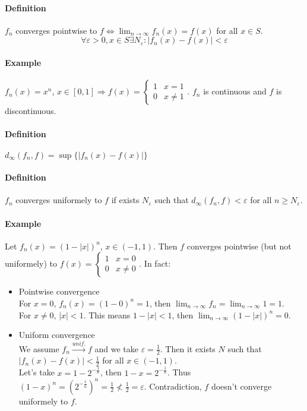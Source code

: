 \documentclass{article}
\newcommand{\DS}{\displaystyle}
\newcommand{\abs}[1]{\left|#1\right|}
\newcommand{\limn}{\lim_{n \to \infty}}
\newcommand{\tounif}{\xrightarrow{unif.}}
\newcommand{\intcc}[1]{\left[#1\right]}
\newcommand{\intoo}[1]{\left(#1\right)}
\newcommand{\Ep}{\varepsilon}
\newcommand{\Def}{\paragraph{Definition}}
\newcommand{\Example}{\paragraph{Example}}
\begin{document}
  \Def $f_n$ converges pointwise to $f \iff \DS \limn{f_n(x)} = f(x)$ for all
  $x \in S$.
\begin{equation*}
  \forall \Ep > 0, x \in S \exists N_\Ep : \abs{f_n(x) - f(x)} < \Ep
\end{equation*}

  \Example $f_n(x) = x^n$, $x \in \intcc{0,1} \Rightarrow f(x) =
  \begin{cases}1 & x = 1 \\ 0 & x \neq 1\end{cases}$. $f_n$ is continuous and
  $f$ is discontinuous.

  \Def $d_\infty(f_n,f) = \sup \{ \abs{f_n(x) - f(x)} \}$

  \Def $f_n$ converges uniformely to $f$ if exists $N_\Ep$ such that
  $d_\infty(f_n,f) < \Ep$ for all $n \geq N_\Ep$.

  \Example Let $f_n(x) = (1 - \abs{x})^n$, $x \in \intoo{-1,1}$. Then $f$
  converges pointwise (but not uniformely) to $f(x) =
  \begin{cases}1 & x = 0 \\ 0 & x \neq 0\end{cases}$. In fact:
\begin{itemize}
  \item Pointwise convergence
\\For $x = 0$, $f_n(x) = (1 - 0)^n = 1$, then $\DS \limn{f_n} = \limn{1} = 1$.
\\For $x \neq 0$, $\abs{x} < 1$. This means $1 - |x| < 1$, then
  $\DS \limn{(1-|x|)^n} = 0$.

  \item Uniform convergence
\\We assume $f_n \tounif f$ and we take $\Ep = \frac{1}{2}$. Then it exists $N$
  such that $\abs{f_n(x) - f(x)} < \frac{1}{2}$ for all $x \in \intoo{-1,1}$.
\\Let's take $x = 1 - 2^{-\frac{1}{n}}$, then $1 - x = 2^{-\frac{1}{n}}$. Thus
  $(1 - x)^n = (2^{-\frac{1}{n}})^n = \frac{1}{2} \nless \frac{1}{2} = \Ep$.
  Contradiction, $f$ doesn't converge uniformely to $f$.
\end{itemize}
\end{document}
